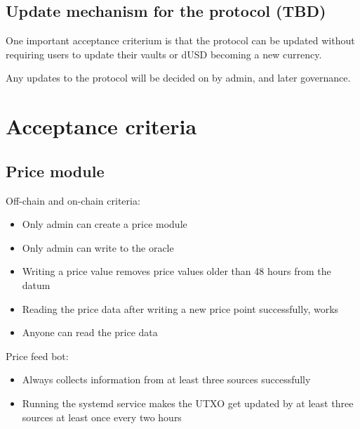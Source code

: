 \documentclass{article} %
\begin{document}
\subsection{Update mechanism for the protocol (TBD)}

One important acceptance criterium is that the protocol can be updated without
requiring users to update their vaults or dUSD becoming a new currency.

Any updates to the protocol will be decided on by admin, and later governance.

\section{Acceptance criteria}

\subsection{Price module}

Off-chain and on-chain criteria:
\begin{itemize}
  \item Only admin can create a price module
  \item Only admin can write to the oracle
  \item Writing a price value removes price values older than 48 hours from the
    datum
  \item Reading the price data after writing a new price point successfully,
    works
  \item Anyone can read the price data
\end{itemize}

Price feed bot:
\begin{itemize}
  \item Always collects information from at least three sources successfully
  \item Running the systemd service makes the UTXO get updated by at least three
    sources at least once every two hours
\end{itemize}
\end{document}
